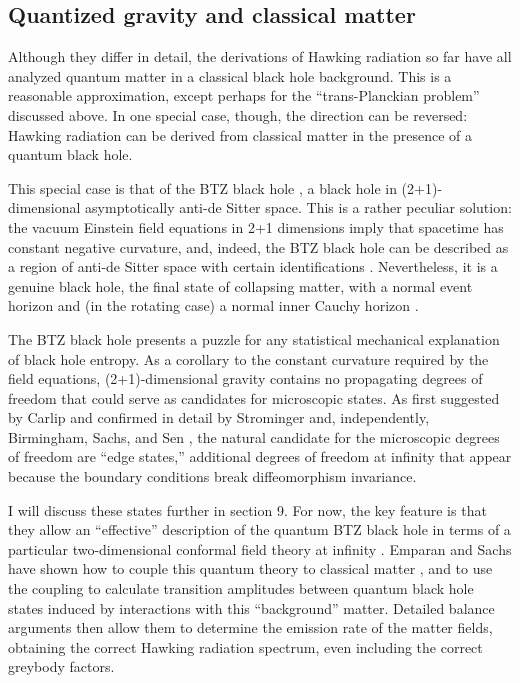 \documentclass[12pt]{article}
\begin{document}
\subsection{Quantized gravity and classical matter \label{BTZa}}

Although they differ in detail, the derivations of Hawking radiation 
so far have all analyzed quantum matter in a classical 
black hole background.  This is a reasonable approximation,
except perhaps for the ``trans-Planckian problem'' discussed
above.  In one special case, though, the direction can be reversed:
Hawking radiation can be derived from classical matter in the
presence of a quantum black hole.

This special case is that of the BTZ black hole \cite{BTZ}, a black
hole in (2+1)-dimensional asymptotically anti-de Sitter space.
This is a rather peculiar solution: the vacuum Einstein field equations
in 2+1 dimensions imply that spacetime has constant negative
curvature, and, indeed, the BTZ black hole can be described as a
region of anti-de Sitter space with certain identifications \cite{BHTZ}.
Nevertheless, it is a genuine black hole, the final state of collapsing
matter, with a normal event horizon and (in the rotating case) a
normal inner Cauchy horizon \cite{CarlipBTZ}.

The BTZ black hole presents a puzzle for any statistical mechanical
explanation of black hole entropy.  As a corollary to the constant curvature
required by the field equations, (2+1)-dimensional gravity contains 
no propagating degrees of freedom that could serve as candidates for
microscopic states.  As first suggested by Carlip \cite{Carlipedge} and
confirmed in detail by Strominger\cite{Strominger} and, independently,
Birmingham, Sachs, and Sen \cite{BSS}, the natural candidate for the
microscopic degrees of freedom are ``edge states,'' additional degrees
of freedom at infinity that appear because the boundary conditions
break diffeomorphism invariance.   

I will discuss these states  further in section 9.  For now, 
the key feature is that they allow an ``effective'' description of the 
quantum BTZ black hole in terms of a particular two-dimensional conformal
field theory at infinity \cite{CarlipBTZb}.   Emparan and Sachs have shown 
how to couple this quantum theory to classical matter \cite{ES}, and 
to use the coupling to calculate transition amplitudes between quantum 
black hole states induced by interactions with this ``background'' matter.  
Detailed balance arguments then allow them to determine the emission 
rate of the matter fields, obtaining the correct Hawking radiation spectrum, 
even including the correct greybody factors.
\end{document}
